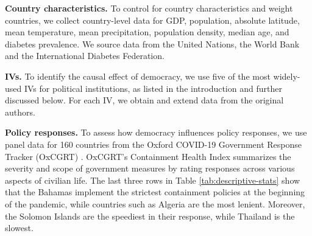 
\textbf{Country characteristics.} To control for country characteristics and weight countries, we collect country-level data for GDP, population, absolute latitude, mean temperature, mean precipitation, population density, median age, and diabetes prevalence. %
We source data from the United Nations, the World Bank and the International Diabetes Federation.  %

\textbf{IVs.} To identify the causal effect of democracy, we use five of the most widely-used IVs for political institutions, as listed in the introduction and further discussed below. For each  IV, we obtain and extend data from the original authors.  %

\textbf{Policy responses.} To assess how democracy influences policy responses, we use panel data for 160 countries from the Oxford COVID-19 Government Response Tracker (OxCGRT) \citep{haleGlobalPanelDatabase2021}. OxCGRT's Containment Health Index summarizes the severity and scope of government measures by rating responses across various aspects of civilian life. The last three rows in Table \ref{tab:descriptive-stats} show that the Bahamas implement the strictest containment policies at the beginning of the pandemic, while countries such as Algeria are the most lenient. Moreover, the Solomon Islands are the speediest in their response, while Thailand is the slowest. 